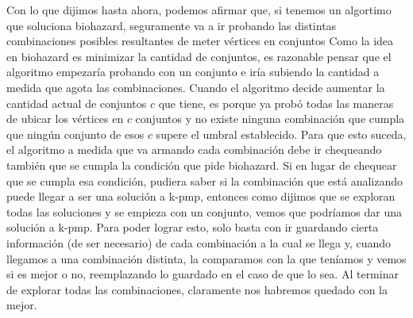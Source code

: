 \documentclass[a4paper]{article}
\begin{document}
\newline Con lo que dijimos hasta ahora, podemos afirmar que, si tenemos un algortimo que soluciona biohazard, seguramente va a ir probando las distintas combinaciones posibles resultantes de meter vértices en conjuntos Como la idea en biohazard es minimizar la cantidad de conjuntos, es razonable pensar que el algoritmo empezaría probando con un conjunto e iría subiendo la cantidad a medida que agota las combinaciones. Cuando el algoritmo decide aumentar la cantidad actual de conjuntos $c$ que tiene, es porque ya probó todas las maneras de ubicar los vértices en $c$ conjuntos y no existe ninguna combinación que cumpla que ningún conjunto de esos $c$ supere el umbral establecido. Para que esto suceda, el algoritmo a medida que va armando cada combinación debe ir chequeando también que se cumpla la condición que pide biohazard. Si en lugar de chequear que se cumpla esa condición, pudiera saber si la combinación que está analizando puede llegar a ser una solución a k-pmp, entonces como dijimos que se exploran todas las soluciones y se empieza con un conjunto, vemos que podríamos dar una solución a k-pmp. Para poder lograr esto, solo basta con ir guardando cierta información (de ser necesario) de cada combinación a la cual se llega y, cuando llegamos a una combinación distinta, la comparamos con la que teníamos y vemos si es mejor o no, reemplazando lo guardado en el caso de que lo sea. Al terminar de explorar todas las combinaciones, claramente nos habremos quedado con la mejor. 
\end{document}
